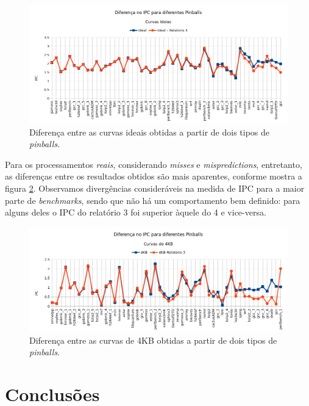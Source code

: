 \documentclass[12pt]{article}
\begin{document}
\begin{figure}[h!]
  \centering
  \includegraphics[width=\textwidth]{img/ideal_pinballs}%
  
  \caption{Diferença entre as curvas ideais obtidas a partir
  de dois tipos de \textit{pinballs}.}
  
  \label{fig:ideal_pinballs}
\end{figure}

Para os processamentos \textit{reais}, considerando \textit{misses} e
\textit{mispredictions}, entretanto, as diferenças entre os resultados
obtidos são mais aparentes, conforme mostra a figura \ref{fig:4KB_pinballs}.
Observamos divergências consideráveis na medida de IPC para a maior parte de
\textit{benchmarks}, sendo que não há um comportamento bem definido: para alguns
deles o IPC do relatório 3 foi superior àquele do 4 e vice-versa.

\begin{figure}[h!]
  \centering
  \includegraphics[width=\textwidth]{img/4KB_pinballs}%
  \caption{Diferença entre as curvas de 4KB obtidas a
  partir de dois tipos de \textit{pinballs}.}
  \label{fig:4KB_pinballs}
\end{figure}

\section{Conclusões}
\end{document}
